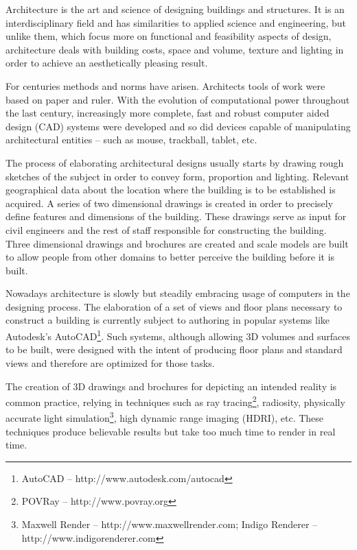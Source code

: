 
Architecture is the art and science of designing buildings and structures.
It is an interdisciplinary field and has similarities to applied science and
engineering, but unlike them, which focus more on functional and feasibility aspects of design, 
architecture deals with building costs, space and volume, texture and lighting
in order to achieve an aesthetically pleasing result.

For centuries methods and norms have arisen. Architects tools of work were based on paper and ruler.
With the evolution of computational power throughout the last century, 
increasingly more complete, fast and robust computer aided design (CAD) systems were developed and so did
devices capable of manipulating architectural entities -- such as mouse, trackball, tablet, etc.

The process of elaborating architectural designs usually starts by drawing rough sketches of the subject
in order to convey form, proportion and lighting. Relevant geographical data about the location
where the building is to be established is acquired. A series of two dimensional drawings is created
in order to precisely define features and dimensions of the building. These drawings serve as
input for civil engineers and the rest of staff responsible for constructing the building.
Three dimensional drawings and brochures are created and scale models are built to allow
people from other domains to better perceive the building before it is built.

Nowadays architecture is slowly but steadily embracing usage of computers in the designing process.
The elaboration of a set of views and floor plans necessary to construct a building is currently
subject to authoring in popular systems like Autodesk's AutoCAD\footnote{AutoCAD -- http://www.autodesk.com/autocad}.
Such systems, although allowing 3D volumes and surfaces to be built, were designed with the intent of
producing floor plans and standard views and therefore are optimized for those tasks.

The creation of 3D drawings and brochures for depicting an intended reality is common practice,
relying in techniques such as
ray tracing\footnote{POVRay -- http://www.povray.org},
radiosity,
physically accurate light simulation\footnote{Maxwell Render -- http://www.maxwellrender.com; Indigo Renderer -- http://www.indigorenderer.com},
high dynamic range imaging (HDRI), etc.
These techniques produce believable results but take too much time to render in real time.


